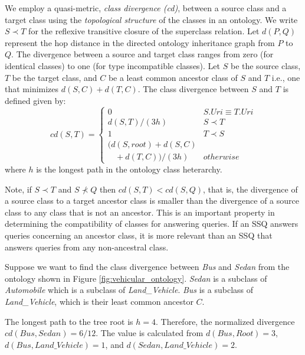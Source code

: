 
We employ a quasi-metric, \textit{class divergence (cd)}, between a source class and a target class using the \textit{topological structure} of the classes in an ontology. We write $S \prec T$ for the reflexive transitive closure of the superclass relation. Let $d(P,Q)$ represent the hop distance in the directed ontology inheritance graph from $P$ to $Q$. The divergence between a source and target class ranges from zero (for identical classes) to one (for type incompatible classes). Let $S$ be the source class, $T$ be the target class, and $C$ be a least common ancestor class of $S$ and $T$ i.e., one that minimizes $d(S,C) + d(T,C)$. The class divergence between $S$ and $T$ is defined given by:
\begin{equation}
cd(S, T) = \begin{cases}
0 & S.{Uri} \equiv T.{Uri}\\
d(S, T)/(3h) & S \prec T\\
1 & T \prec S\\
(d(S,root) + d(S,C) \\ \ \ \ \ + d(T,C))/(3h) & otherwise
\end{cases}
\end{equation}
where $h$ is the longest path in the ontology class heterarchy.

Note, if $S \prec T$ and $S \not\prec Q$ then $cd(S,T) < cd(S,Q)$, that is, the divergence of a source class to a target ancestor class is smaller than the divergence of a source class to any class that is not an ancestor. This is an important property in determining the compatibility of classes for answering queries.  If an SSQ answers queries concerning an ancestor class, it is more relevant than an SSQ that answers queries from any non-ancestral class.

Suppose we want to find the class divergence between \emph{Bus} and \emph{Sedan} from the ontology shown in Figure \ref{fig:vehicular_ontology}. \emph{Sedan} is a subclass of \emph{Automobile} which is a subclass of \emph{Land\_Vehicle}.  \emph{Bus} is a subclass of \emph{Land\_Vehicle}, which is their least common ancestor $C$.  

The longest path to the tree root is $h = 4$. Therefore, the normalized divergence $cd(Bus, Sedan) = 6/12$. The value is calculated from $d(Bus, Root) = 3$, $d(Bus, Land\_Vehicle) = 1$, and $d(Sedan, Land\_Vehicle) = 2$.

